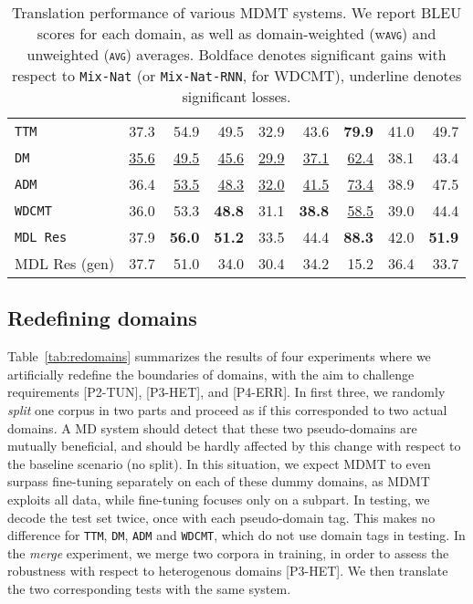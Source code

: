 \documentclass[11pt,a4paper]{article}
\newcommand{\fyTodo}[1]{\Todo[FY:]{\textcolor{orange}{#1}}}
\newcommand{\fyDone}[1]{\done[FY]\Todo[FY:]{\textcolor{orange}{#1}}}
\newcommand{\domain}[1]{\texttt{\textsc{#1}}}
\newcommand{\system}[1]{\texttt{{#1}}}
\newcommand{\SB}[1]{\textbf{#1}}
\newcommand{\SW}[1]{\underline{#1}}
\begin{document}
\begin{table*}
\begin{tabular}{|p{3cm}|*{8}{r|}}
    \system{TTM}            & 37.3 & 54.9 & 49.5 & 32.9 & 43.6 & \SB{79.9} &41.0 & 49.7     \\%
    \system{DM}             & \SW{35.6} & \SW{49.5}  & \SW{45.6}& \SW{29.9} & \SW{37.1} & \SW{62.4} & 38.1 & 43.4 \\ %
    \system{ADM}           & 36.4 & \SW{53.5}  & \SW{48.3} & \SW{32.0} & \SW{41.5} & \SW{73.4} & 38.9 & 47.5 \\%
    \system{WDCMT}       & 36.0 & 53.3 & \SB{48.8} & 31.1 & \SB{38.8} & \SW{58.5} & 39.0 & 44.4 \\ %
    \system{MDL Res}     & 37.9 & \SB{56.0}  & \SB{51.2}   & 33.5   &  44.4  & \SB{88.3} & 42.0 & \SB{51.9} \\%
    \hfill MDL Res (gen)    & 37.7 & 51.0 & 34.0 & 30.4 & 34.2 & 15.2 & 36.4 & 33.7\\
     \hline
  \end{tabular}
  \caption{Translation performance of various MDMT systems. We report BLEU scores for each domain, as well as domain-weighted (w\domain{avg}) and unweighted (\domain{avg}) averages. Boldface denotes significant gains with respect to \system{Mix-Nat} (or \system{Mix-Nat-RNN}, for WDCMT), underline denotes significant losses.}
  \label{tab:performance}
  \fyDone{Do we have significancy tests for averages?} %
\end{table*}

\subsection{Redefining domains \label{ssec:redomains}}

Table~\ref{tab:redomains} summarizes the results of four experiments where we artificially redefine the boundaries of domains, with the aim to challenge requirements [P2-TUN], [P3-HET], and [P4-ERR]. In first three, we randomly \emph{split} one corpus in two parts and proceed as if this corresponded to two actual domains. A MD system should detect that these two pseudo-domains are mutually beneficial, and should be hardly affected by this change with respect to the baseline scenario (no split). In this situation, we expect MDMT to even surpass fine-tuning separately on each of these dummy domains, as MDMT exploits all data, while fine-tuning focuses only on a subpart. In testing, we decode the test set twice, once with each pseudo-domain tag. This makes no difference for \system{TTM}, \system{DM}, \system{ADM} and \system{WDCMT}, which do not use domain tags in testing.
In the \textsl{merge} experiment, we merge two corpora in training, in order to assess the robustness with respect to heterogenous domains [P3-HET]. We then translate the two corresponding tests with the same system.
\end{document}
